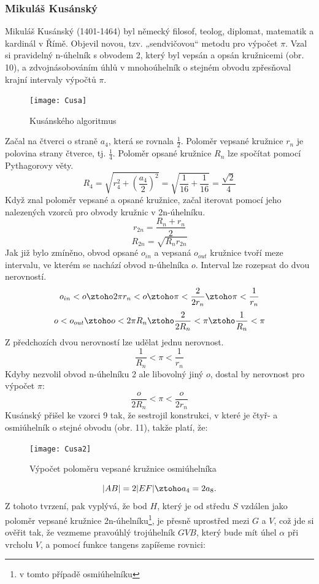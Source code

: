 \documentclass[rocnikovka]{gzwroc} %
\begin{document}
\subsubsection{Mikuláš Kusánský}
Mikuláš Kusánský (1401-1464) byl německý filosof, teolog, diplomat, matematik a kardinál v Římě. Objevil novou, tzv. „sendvičovou“ metodu pro výpočet $\pi$. Vzal si pravidelný n-úhelník s obvodem 2, který byl vepsán a opsán kružnicemi (obr. 10), a zdvojnásobováním úhlů v mnohoúhelník o stejném obvodu zpřesňoval krajní intervaly výpočtů $\pi$.

\begin{figure}[!ht]
\texttt{[image: Cusa]}
\caption{Kusánského algoritmus}
\label{fig:kruh}
\end{figure}
Začal na čtverci o straně $a_4$, která se rovnala $\frac{1}{2}$. Poloměr vepsané kružnice $r_n$ je polovina strany čtverce, tj. $\frac{1}{4}$. Poloměr opsané kružnice $R_n$ lze spočítat pomocí Pythagorovy věty.
$$
R_4=\sqrt{r_4^2+\left(\frac{a_4}{2}\right)^2}=\sqrt{\frac{1}{16}+\frac{1}{16}}=\frac{\sqrt{2}}{4}
$$
Když znal poloměr vepsané a opsané kružnice, začal iterovat pomocí jeho nalezených vzorců pro obvody kružnic v 2n-úhelníku.
\begin{equation}
r_{2n}=\frac{R_n+r_n}{2} 
\end{equation}
\begin{equation}
R_{2n}=\sqrt{R_nr_{2n}}
\end{equation} 
Jak již bylo zmíněno, obvod opsané $o_{in}$ a vepsaná $o_{out}$ kružnice tvoří meze intervalu, ve kterém se nachází obvod n-úhelníka $o$. Interval lze rozepsat do dvou nerovností.
$$
o_{in}<o \ztoho 2\pi r_n<o \ztoho \pi<\frac{2}{2r_n} \ztoho \pi<\frac{1}{r_n}
$$
$$
o<o_{out} \ztoho o<2\pi R_n \ztoho \frac{2}{2R_n}<\pi \ztoho \frac{1}{R_n}<\pi
$$
Z předchozích dvou nerovností lze udělat jednu nerovnost.
\begin{equation}
\frac{1}{R_n}<\pi<\frac{1}{r_n}
\end{equation}
Kdyby nezvolil obvod n-úhelníku 2 ale libovolný jiný $o$, dostal by nerovnost pro výpočet $\pi$:
$$
\frac{o}{2R_n}<\pi<\frac{o}{2r_n}
$$
Kusánský přišel ke vzorci 9 tak, že sestrojil konstrukci, v které je čtyř- a osmiúhelník o stejné obvodu (obr. 11), takže platí, že:
\begin{figure}[!ht]
\texttt{[image: Cusa2]}
\caption{Výpočet poloměru vepsané kružnice osmiúhelníka}
\label{fig:kruh}
\end{figure}
$$
|AB|=2|EF| \ztoho a_4=2a_8.
$$
Z tohoto tvrzení, pak vyplývá, že bod $H$, který je od středu $S$ vzdálen jako poloměr vepsané kružnice 2n-úhelníku\footnote[7]{v tomto případě osmiúhelníku}, je přesně uprostřed mezi $G$ a $V$, což jde si ověřit tak, že vezmeme pravoúhlý trojúhelník $GVB$, který bude mít úhel $\alpha$ při vrcholu $V$, a pomocí funkce tangens zapíšeme rovnici: %
\end{document}
